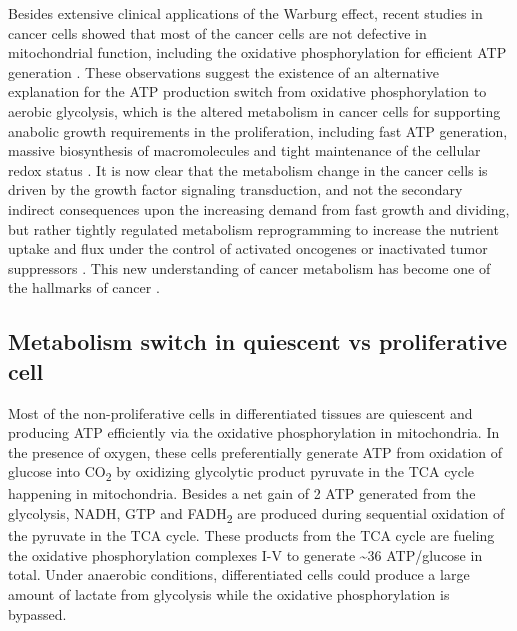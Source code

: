 Besides extensive clinical applications of the Warburg effect, recent studies in cancer cells showed that most of the cancer cells are not defective in mitochondrial function, including the oxidative phosphorylation for efficient ATP generation  \cite{fantin_attenuation_2006,moreno-sanchez_energy_2007,weinhouse_warburg_1976}. These observations suggest the existence of an alternative explanation for the ATP production switch from oxidative phosphorylation to aerobic glycolysis, which is the altered metabolism in cancer cells for supporting anabolic growth requirements in the proliferation, including fast ATP generation, massive biosynthesis of macromolecules and tight maintenance of the cellular redox status  \cite{cairns_regulation_2011}. It is now clear that the metabolism change in the cancer cells is driven by the growth factor signaling transduction, and not the secondary indirect consequences upon the increasing demand from fast growth and dividing, but rather tightly regulated metabolism reprogramming to increase the nutrient uptake and flux under the control of activated oncogenes or inactivated tumor suppressors  \cite{ward_metabolic_2012}. This new understanding of cancer metabolism has become one of the hallmarks of cancer  \cite{hanahan_hallmarks_2011}.

\subsection{Metabolism switch in quiescent vs proliferative cell}

Most of the non-proliferative cells in differentiated tissues are quiescent and producing ATP efficiently via the oxidative phosphorylation in mitochondria. In the presence of oxygen, these cells preferentially generate ATP from oxidation of glucose into CO\textsubscript{2} by oxidizing glycolytic product pyruvate in the TCA cycle happening in mitochondria. Besides a net gain of 2 ATP generated from the glycolysis, NADH, GTP and FADH\textsubscript{2} are produced during sequential oxidation of the pyruvate in the TCA cycle. These products from the TCA cycle are fueling the oxidative phosphorylation complexes I-V to generate \textasciitilde36 ATP/glucose in total. Under anaerobic conditions, differentiated cells could produce a large amount of lactate from glycolysis while the oxidative phosphorylation is bypassed.

